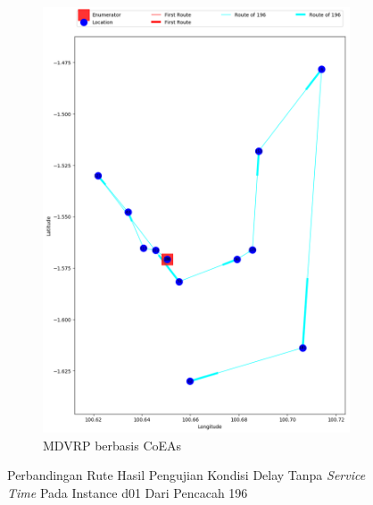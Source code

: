 \begin{figure}[H]
	\centering
	\begin{subfigure}[t]{\textwidth}
		\centering
		\includegraphics[width=\textwidth]{Resources/Images/delayed_1/real_m15_n100_delayed_1_196_coes}
		\caption{MDVRP berbasis CoEAs}
		\label{fig:real_m15_n100_delayed_1_196_coes}
	\end{subfigure}
	\caption{Perbandingan Rute Hasil Pengujian Kondisi Delay Tanpa \textit{Service Time} Pada Instance d01 Dari Pencacah 196}
	\label{fig:real_m15_n100_delayed_1_196}
\end{figure}


